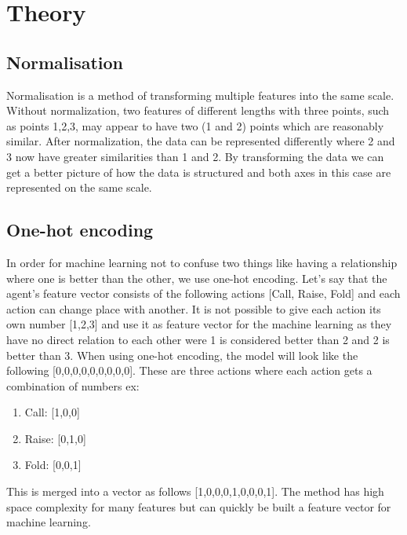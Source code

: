 \documentclass[../main.tex]{subfiles}
\begin{document}
\section{Theory}
\subsection{Normalisation}
Normalisation is a method of transforming multiple features into the same scale. Without normalization, two features of different lengths with three points, such as points 1,2,3, may appear to have two (1 and 2) points which are reasonably similar. After normalization, the data can be represented differently where 2 and 3 now have greater similarities than 1 and 2. By transforming the data we can get a better picture of how the data is structured and both axes in this case are represented on the same scale.
\subsection{One-hot encoding}
In order for machine learning not to confuse two things like having a relationship where one is better than the other, we use one-hot encoding. 
Let's say that the agent's feature vector consists of the following actions [Call, Raise, Fold] and each action can change place with another. It is not possible to give each action its own number [1,2,3] and use it as feature vector for the machine learning as they have no direct relation to each other were 1 is considered better than 2 and 2 is better than 3. When using one-hot encoding, the model will look like the following [0,0,0,0,0,0,0,0,0]. 
These are three actions where each action gets a combination of numbers ex: 
\begin{enumerate}
    \item Call: [1,0,0]
    \item Raise: [0,1,0]
    \item Fold: [0,0,1] 
\end{enumerate}

This is merged into a vector as follows [1,0,0,0,1,0,0,0,1]. The method has high space complexity for many features but can quickly be built a feature vector for machine learning.
\end{document}
